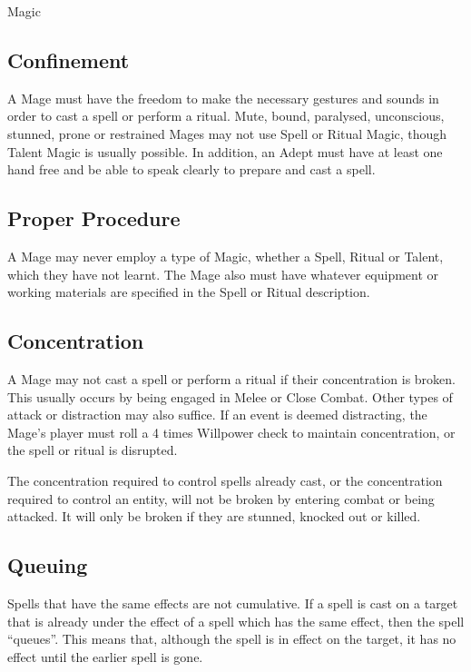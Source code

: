 \begin{Chapter}{Magic}
\begin{Enumerate}
\end{Enumerate}


\subsection{Confinement}

A Mage must have the freedom to make the necessary gestures and sounds
in order to cast a spell or perform a ritual.  Mute, bound, paralysed,
unconscious, stunned, prone or restrained Mages may not use Spell or
Ritual Magic, though Talent Magic is usually possible.  In addition,
an Adept must have at least one hand free and be able to speak clearly
to prepare and cast a spell.

\subsection{Proper Procedure}

A Mage may never employ a type of Magic, whether a Spell, Ritual or
Talent, which they have not learnt.  The Mage also must have whatever
equipment or working materials are specified in the Spell or Ritual
description.

\subsection{Concentration}

A Mage may not cast a spell or perform a ritual if their concentration
is broken.  This usually occurs by being engaged in Melee or Close
Combat.  Other types of attack or distraction may also suffice. If an
event is deemed distracting, the Mage’s player must roll a 4 times
Willpower check to maintain concentration, or the spell or ritual is
disrupted.

The concentration required to control spells already cast, or the
concentration required to control an entity, will not be broken by
entering combat or being attacked.  It will only be broken if they are
stunned, knocked out or killed.

\subsection{Queuing}

Spells that have the same effects are not cumulative.  If a spell is
cast on a target that is already under the effect of a spell which has
the same effect, then the spell “queues”.  This means that, although
the spell is in effect on the target, it has no effect until the
earlier spell is gone.


\end{Chapter}
